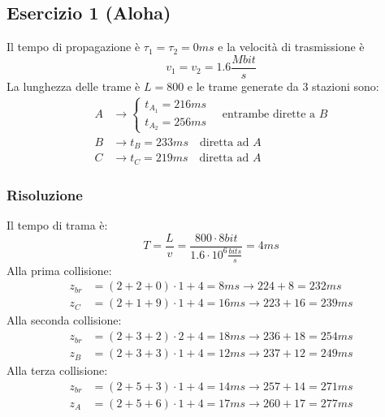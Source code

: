 \documentclass[a4paper]{article}
\begin{document}
\subsection{Esercizio 1 (Aloha)}
Il tempo di propagazione è \( \tau_1 = \tau_2 = 0ms \) e la velocità di trasmissione è
\[
  v_1 = v_2 = 1.6 \frac{Mbit}{s}
\] 
La lunghezza delle trame è \( L = 800\) e le trame generate da 3 stazioni sono:
\[
\begin{aligned}
  A &\to 
  \begin{cases}
    t_{A_1} = 216ms\\
    t_{A_2} = 256ms
  \end{cases} \quad \text{entrambe dirette a }B\\
  B &\to t_B = 233ms \quad \text{diretta ad }A\\
  C &\to t_C = 219ms \quad \text{diretta ad }A
\end{aligned}
\]

\subsubsection{Risoluzione}
Il tempo di trama è:
\[
  T = \frac{L}{v} = \frac{800 \cdot 8bit}{1.6 \cdot 10^6 \frac{bits}{s}} = 4ms
\]
\label{11-12-edD1}
\noindent
Alla prima collisione:
\[
  \begin{aligned}
    z_{br} &= (2+2+0) \cdot 1 + 4 = 8ms \to 224 + 8 = 232ms\\
    z_C &= (2+1+9) \cdot 1 + 4 = 16ms \to 223 + 16 = 239ms
  \end{aligned}
\] 
Alla seconda collisione:
\[
\begin{aligned}
  z_{br} &= (2+3+2) \cdot 2 + 4 = 18ms \to 236 + 18 = 254ms\\
  z_B &= (2+3+3) \cdot 1 + 4 = 12ms \to 237 + 12 = 249ms
\end{aligned}
\] 
Alla terza collisione:
\[
\begin{aligned}
  z_{br} &= (2+5+3) \cdot 1 + 4 = 14ms \to 257 + 14 = 271ms\\
  z_A &= (2+5+6) \cdot 1 + 4 = 17ms \to 260 + 17 = 277ms
\end{aligned}
\] 
\end{document}
